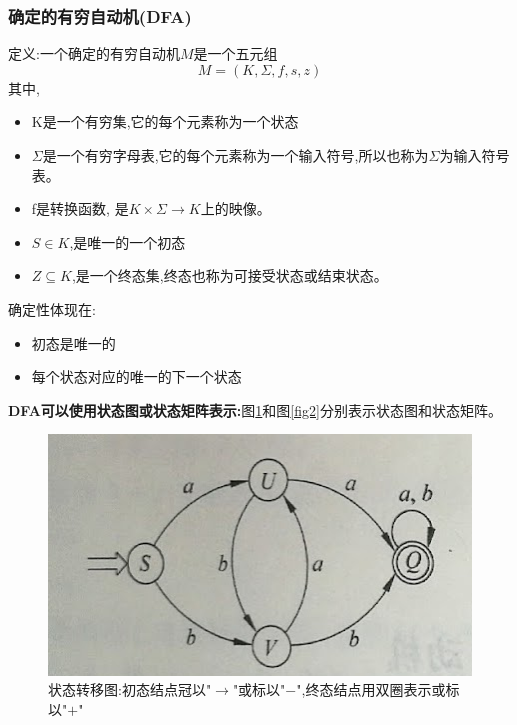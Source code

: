 \spaceline
\subsubsection{确定的有穷自动机(DFA)}
定义:一个确定的有穷自动机$M$是一个五元组
\[M = (K , \Sigma , f , s , z)\]
其中,
\begin{itemize}
 \item [(1)] K是一个有穷集,它的每个元素称为一个状态
 \item [(2)] $\Sigma$是一个有穷字母表,它的每个元素称为一个输入符号,所以也称为$\Sigma$为输入符号表。
 \item [(3)] f是转换函数, 是$K\times \Sigma \to K$上的映像。
 \item [(4)] $S\in K$,是唯一的一个初态
 \item [(5)] $Z \subseteq  K$,是一个终态集,终态也称为可接受状态或结束状态。
\end{itemize}
确定性体现在:
\begin{itemize}
 \item 初态是唯一的
 \item 每个状态对应的唯一的下一个状态
\end{itemize}

\textbf{DFA可以使用状态图或状态矩阵表示:}图\ref{fig1}和图\ref{fig2}分别表示状态图和状态矩阵。

\begin{figure}[H]
 \centering
 \includegraphics[scale = 0.3]{assets/CompilerConstructionPrinciples_5398e.png}
 \caption{状态转移图:初态结点冠以"$\rightarrow$"或标以"$-$",终态结点用双圈表示或标以"$+$"}
 \label{fig1}
\end{figure}

